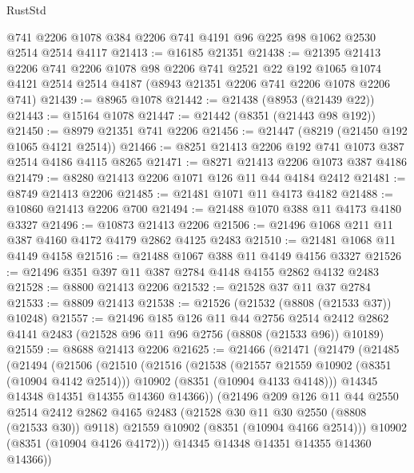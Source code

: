 \begin{lexlean}{RustStd}
\begin{coremodule}
    @741
    @2206
    @1078
    @384
    @2206
    @741
    @4191
    @96
    @225
    @98
    @1062
    @2530
    @2514
    @2514
    @4117
@21413 := @16185 @21351
@21438 := @21395
    @21413
    @2206
    @741
    @2206
    @1078
    @98
    @2206
    @741
    @2521
    @22
    @192
    @1065
    @1074
    @4121
    @2514
    @2514
    @4187
    (@8943 @21351 @2206 @741 @2206 @1078 @2206 @741)
@21439 := @8965 @1078
@21442 := @21438 (@8953 (@21439 @22))
@21443 := @15164 @1078
@21447 := @21442 (@8351 (@21443 @98 @192))
@21450 := @8979 @21351 @741 @2206
@21456 := @21447 (@8219 (@21450 @192 @1065 @4121 @2514))
@21466 := @8251 @21413 @2206 @192 @741 @1073 @387 @2514 @4186 @4115 @8265
@21471 := @8271 @21413 @2206 @1073 @387 @4186
@21479 := @8280 @21413 @2206 @1071 @126 @11 @44 @4184 @2412
@21481 := @8749 @21413 @2206
@21485 := @21481 @1071 @11 @4173 @4182
@21488 := @10860 @21413 @2206 @700
@21494 := @21488 @1070 @388 @11 @4173 @4180 @3327
@21496 := @10873 @21413 @2206
@21506 := @21496 @1068 @211 @11 @387 @4160 @4172 @4179 @2862 @4125 @2483
@21510 := @21481 @1068 @11 @4149 @4158
@21516 := @21488 @1067 @388 @11 @4149 @4156 @3327
@21526 := @21496 @351 @397 @11 @387 @2784 @4148 @4155 @2862 @4132 @2483
@21528 := @8800 @21413 @2206
@21532 := @21528 @37 @11 @37 @2784
@21533 := @8809 @21413
@21538 := @21526 (@21532 (@8808 (@21533 @37)) @10248)
@21557 := @21496
    @185
    @126
    @11
    @44
    @2756
    @2514
    @2412
    @2862
    @4141
    @2483
    (@21528 @96 @11 @96 @2756 (@8808 (@21533 @96)) @10189)
@21559 := @8688 @21413 @2206
@21625 := @21466
    (@21471
      (@21479
        (@21485
          (@21494
            (@21506
              (@21510
                (@21516
                  (@21538
                    (@21557 @21559 @10902 (@8351 (@10904 @4142 @2514)))
                    @10902
                    (@8351 (@10904 @4133 @4148)))
                  @14345
                  @14348
                  @14351
                  @14355
                  @14360
                  @14366))
              (@21496
                @209
                @126
                @11
                @44
                @2550
                @2514
                @2412
                @2862
                @4165
                @2483
                (@21528 @30 @11 @30 @2550 (@8808 (@21533 @30)) @9118)
                @21559
                @10902
                (@8351 (@10904 @4166 @2514)))
              @10902
              (@8351 (@10904 @4126 @4172)))
            @14345
            @14348
            @14351
            @14355
            @14360
            @14366))

\end{coremodule}
\end{lexlean}
